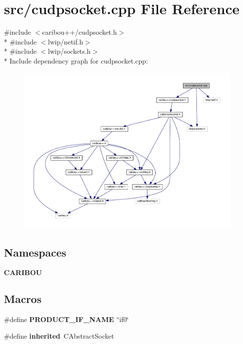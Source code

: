 \section{src/cudpsocket.cpp File Reference}
\label{cudpsocket_8cpp}
{\ttfamily \#include $<$caribou++/cudpsocket.\+h$>$}\\*
{\ttfamily \#include $<$lwip/netif.\+h$>$}\\*
{\ttfamily \#include $<$lwip/sockets.\+h$>$}\\*
Include dependency graph for cudpsocket.\+cpp\+:
\nopagebreak
\begin{figure}[H]
\begin{center}
\leavevmode
\includegraphics[width=350pt]{cudpsocket_8cpp__incl}
\end{center}
\end{figure}
\subsection*{Namespaces}
\begin{DoxyCompactItemize}
\item 
 {\bf C\+A\+R\+I\+B\+OU}
\end{DoxyCompactItemize}
\subsection*{Macros}
\begin{DoxyCompactItemize}
\item 
\#define {\bf P\+R\+O\+D\+U\+C\+T\+\_\+\+I\+F\+\_\+\+N\+A\+ME}~\char`\"{}if0\char`\"{}
\item 
\#define {\bf inherited}~C\+Abstract\+Socket
\end{DoxyCompactItemize}


